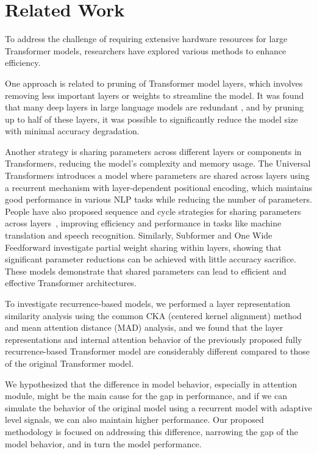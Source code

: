 \section{Related Work}
\label{2.2.pe transformer}
To address the challenge of requiring extensive hardware resources for large Transformer models, researchers have explored various methods to enhance efficiency.

One approach is related to pruning of Transformer model layers, which involves removing less important layers or weights to streamline the model. It was found that many deep layers in large language models are redundant \cite{gromov2024unreasonable}, and by pruning up to half of these layers, it was possible to significantly reduce the model size with minimal accuracy degradation. 

Another strategy is sharing parameters across different layers or components in Transformers, reducing the model's complexity and memory usage. The Universal Transformers \cite{dehghani2019universal} introduces a model where parameters are shared across layers using a recurrent mechanism with layer-dependent positional encoding, which maintains good performance in various NLP tasks while reducing the number of parameters. People have also proposed sequence and cycle strategies for sharing parameters across layers~\cite{takase2021lessons}, improving efficiency and performance in tasks like machine translation and speech recognition. Similarly, Subformer \cite{reid2021subformer} and One Wide Feedforward \cite{pires2023wide} investigate partial weight sharing within layers, showing that significant parameter reductions can be achieved with little accuracy sacrifice. These models demonstrate that shared parameters can lead to efficient and effective Transformer architectures.

To investigate recurrence-based models, we performed a layer representation similarity analysis using the common CKA (centered kernel alignment) \cite{kornblith2019similarity} method and mean attention distance (MAD) \cite{dosovitskiy2020image} analysis, and we found that the layer representations and internal attention behavior of the previously proposed fully recurrence-based Transformer model \cite{dehghani2019universal} are considerably different compared to those of the original Transformer model.

We hypothesized that the difference in model behavior, especially in attention module, might be the main cause for the gap in performance, and if we can simulate the behavior of the original model using a recurrent model with adaptive level signals, we can also maintain higher performance. Our proposed methodology is focused on addressing this difference, narrowing the gap of the model behavior, and in turn the model performance.